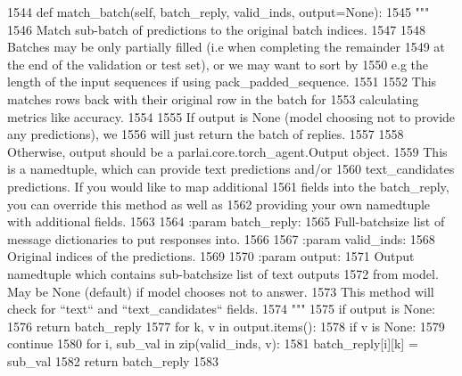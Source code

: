 \begin{DoxyCode}
1544     \textcolor{keyword}{def }match\_batch(self, batch\_reply, valid\_inds, output=None):
1545         \textcolor{stringliteral}{"""}
1546 \textcolor{stringliteral}{        Match sub-batch of predictions to the original batch indices.}
1547 \textcolor{stringliteral}{}
1548 \textcolor{stringliteral}{        Batches may be only partially filled (i.e when completing the remainder}
1549 \textcolor{stringliteral}{        at the end of the validation or test set), or we may want to sort by}
1550 \textcolor{stringliteral}{        e.g the length of the input sequences if using pack\_padded\_sequence.}
1551 \textcolor{stringliteral}{}
1552 \textcolor{stringliteral}{        This matches rows back with their original row in the batch for}
1553 \textcolor{stringliteral}{        calculating metrics like accuracy.}
1554 \textcolor{stringliteral}{}
1555 \textcolor{stringliteral}{        If output is None (model choosing not to provide any predictions), we}
1556 \textcolor{stringliteral}{        will just return the batch of replies.}
1557 \textcolor{stringliteral}{}
1558 \textcolor{stringliteral}{        Otherwise, output should be a parlai.core.torch\_agent.Output object.}
1559 \textcolor{stringliteral}{        This is a namedtuple, which can provide text predictions and/or}
1560 \textcolor{stringliteral}{        text\_candidates predictions. If you would like to map additional}
1561 \textcolor{stringliteral}{        fields into the batch\_reply, you can override this method as well as}
1562 \textcolor{stringliteral}{        providing your own namedtuple with additional fields.}
1563 \textcolor{stringliteral}{}
1564 \textcolor{stringliteral}{        :param batch\_reply:}
1565 \textcolor{stringliteral}{            Full-batchsize list of message dictionaries to put responses into.}
1566 \textcolor{stringliteral}{}
1567 \textcolor{stringliteral}{        :param valid\_inds:}
1568 \textcolor{stringliteral}{            Original indices of the predictions.}
1569 \textcolor{stringliteral}{}
1570 \textcolor{stringliteral}{        :param output:}
1571 \textcolor{stringliteral}{            Output namedtuple which contains sub-batchsize list of text outputs}
1572 \textcolor{stringliteral}{            from model. May be None (default) if model chooses not to answer.}
1573 \textcolor{stringliteral}{            This method will check for ``text`` and ``text\_candidates`` fields.}
1574 \textcolor{stringliteral}{        """}
1575         \textcolor{keywordflow}{if} output \textcolor{keywordflow}{is} \textcolor{keywordtype}{None}:
1576             \textcolor{keywordflow}{return} batch\_reply
1577         \textcolor{keywordflow}{for} k, v \textcolor{keywordflow}{in} output.items():
1578             \textcolor{keywordflow}{if} v \textcolor{keywordflow}{is} \textcolor{keywordtype}{None}:
1579                 \textcolor{keywordflow}{continue}
1580             \textcolor{keywordflow}{for} i, sub\_val \textcolor{keywordflow}{in} zip(valid\_inds, v):
1581                 batch\_reply[i][k] = sub\_val
1582         \textcolor{keywordflow}{return} batch\_reply
1583 
\end{DoxyCode}
